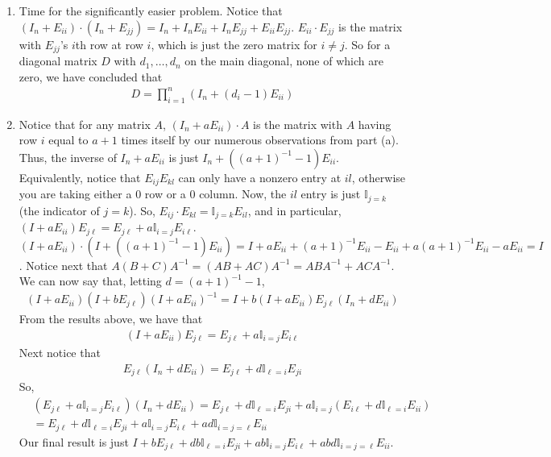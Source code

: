 \documentclass[12pt]{article}
\theoremstyle{definitionstyle}
\def\mbb#1{\mathbb{#1}}
\begin{document}
\begin{enumerate}[leftmargin=\labelsep]
\begin{enumerate}
			\item Time for the significantly easier problem. Notice that $(I_n+E_{ii}) \cdot (I_n+E_{jj}) = I_n + I_n E_{ii} + I_n E_{jj} + E_{ii}E_{jj}$. $E_{ii} \cdot E_{jj}$ is the matrix with $E_{jj}$'s $i$th row at row $i$, which is just the zero matrix for $i \neq j$. So for a diagonal matrix $D$ with $d_1, \ldots, d_n$ on the main diagonal, none of which are zero, we have concluded that
			\begin{align*}
				D = \prod_{i=1}^n (I_n+(d_i-1)E_{ii})
			\end{align*}
		
			\item Notice that for any matrix $A$, $(I_n + aE_{ii}) \cdot A$ is the matrix with $A$ having row $i$ equal to $a+1$ times itself by our numerous observations from part (a). Thus, the inverse of $I_n+aE_{ii}$ is just $I_n+((a+1)^{-1}-1)E_{ii}$. Equivalently, notice that $E_{ij}E_{kl}$ can only have a nonzero entry at $il$, otherwise you are taking either a 0 row or a 0 column. Now, the $il$ entry is just $\mbb I_{j=k}$ (the indicator of $j=k$). So, $E_{ij} \cdot E_{kl} = \mbb I_{j=k} E_{il}$, and in particular, $(I+aE_{ii})E_{j\ell} = E_{j\ell} + a \mbb I_{i=j} E_{i\ell}$. $(I+aE_{ii}) \cdot (I+((a+1)^{-1}-1)E_{ii}) = I + aE_{ii} + (a+1)^{-1}E_{ii} - E_{ii} + a(a+1)^{-1}E_{ii} - aE_{ii} = I$. Notice next that $A(B+C)A^{-1} = (AB+AC)A^{-1} = ABA^{-1} + ACA^{-1}$. We can now say that, letting $d = (a+1)^{-1}-1$,
			\begin{align*}
				(I+aE_{ii})(I+bE_{j\ell})(I+aE_{ii})^{-1} = I + b(I+aE_{ii})E_{j\ell}(I_n+dE_{ii})
			\end{align*}
			From the results above, we have that
			\begin{align*}
				(I+aE_{ii})E_{j\ell} = E_{j\ell} + a \mbb I_{i=j} E_{i\ell}
			\end{align*}
			Next notice that
			\begin{align*}
				E_{j \ell} (I_n+dE_{ii}) = E_{j\ell} + d \mbb I_{\ell = i} E_{ji}
			\end{align*}
			So,
			\begin{align*}
				&(E_{j\ell} + a \mbb I_{i=j} E_{i\ell})(I_n+dE_{ii}) = E_{j\ell} + d \mbb I_{\ell = i} E_{ji} + a \mbb I_{i = j} (E_{i\ell} + d \mbb I_{\ell = i} E_{ii}) \\
				&= E_{j\ell} + d \mbb I_{\ell = i} E_{ji} + a\mbb I_{i = j} E_{i\ell} + ad\mbb I_{i = j = \ell} E_{ii}
			\end{align*}
			Our final result is just $I + bE_{j\ell} + db \mbb I_{\ell = i} E_{ji} + ab\mbb I_{i = j} E_{i\ell} + abd\mbb I_{i = j = \ell} E_{ii}$.
			

\end{enumerate}
\end{enumerate}
\end{document}
